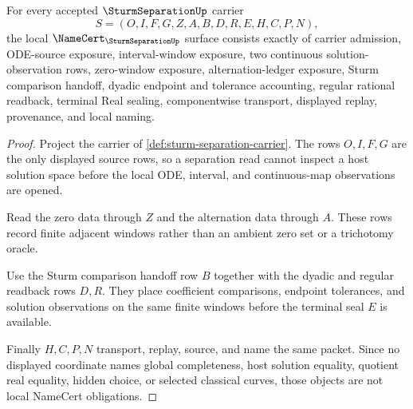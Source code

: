 \begin{theorem}
\label{thm:sturm-separation-namecert-obligations}
For every accepted $\SturmSeparationUp$ carrier
$$
S=(O,I,F,G,Z,A,B,D,R,E,H,C,P,N),
$$
the local $\NameCert_{\SturmSeparationUp}$ surface consists exactly of carrier admission, ODE-source exposure, interval-window exposure, two continuous solution-observation rows, zero-window exposure, alternation-ledger exposure, Sturm comparison handoff, dyadic endpoint and tolerance accounting, regular rational readback, terminal Real sealing, componentwise transport, displayed replay, provenance, and local naming.
\end{theorem}
\begin{proof}
Project the carrier of \autoref{def:sturm-separation-carrier}. The rows $O,I,F,G$ are the only displayed source rows, so a separation read cannot inspect a host solution space before the local ODE, interval, and continuous-map observations are opened.

Read the zero data through $Z$ and the alternation data through $A$. These rows record finite adjacent windows rather than an ambient zero set or a trichotomy oracle.

Use the Sturm comparison handoff row $B$ together with the dyadic and regular readback rows $D,R$. They place coefficient comparisons, endpoint tolerances, and solution observations on the same finite windows before the terminal seal $E$ is available.

Finally $H,C,P,N$ transport, replay, source, and name the same packet. Since no displayed coordinate names global completeness, host solution equality, quotient real equality, hidden choice, or selected classical curves, those objects are not local NameCert obligations.
\end{proof}

